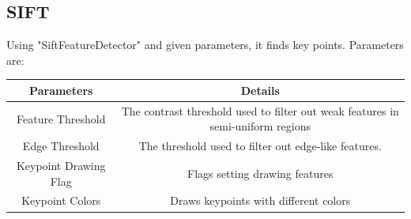 \documentclass{article}
\begin{document}
	
	\subsection{SIFT}
	Using "SiftFeatureDetector" and given parameters, it finds key points. Parameters are:
	
\begin{table}[H]
\begin{center}
\begin{tabular}{|c|c|l|l|l|}
\hline
\textbf{Parameters}   & \multicolumn{4}{|c|}{\textbf{Details}}                                                                \\ \hline
Feature Threshold     & \multicolumn{4}{|c|}{The contrast threshold used to filter out weak features in semi-uniform regions} \\ \hline
Edge Threshold        & \multicolumn{4}{|c|}{The threshold used to filter out edge-like features.}                            \\ \hline
Keypoint Drawing Flag & \multicolumn{4}{|c|}{Flags setting drawing features}                                                  \\ \hline
Keypoint Colors       & \multicolumn{4}{|c|}{Draws keypoints with different colors}                                           \\ \hline
\end{tabular}
\end{center}
\end{table}
	
	
	
\end{document}
